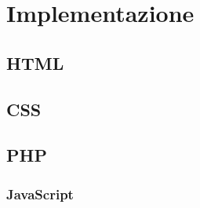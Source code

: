 \section{Implementazione}
\label{implementazione}

\subsection{HTML}
\label{implementazione-back-end-HTML}

\subsection{CSS}
\label{implementazione-front-end-CSS}

\subsection{PHP}
\label{implementazione-back-end-PHP}

\subsubsection{JavaScript}
\label{implementazione-front-end-JavaScript}
